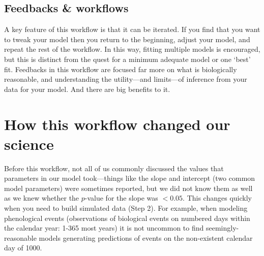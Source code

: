 \documentclass[11pt]{article}
\begin{document}
\subsection*{Feedbacks \& workflows}
A key feature of this workflow is that it can be iterated.  If you find that you want to tweak your model then you return to the beginning, adjust your model, and repeat the rest of the workflow. In this way, fitting multiple models is encouraged, but this is distinct from the quest for a minimum adequate model or one `best' fit. Feedbacks in this workflow are focused far more on what is biologically reasonable, and understanding the utility---and limits---of inference from your data for your model.  And there are big benefits to it. 


\section*{How this workflow changed our science} 
Before this workflow, not all of us commonly discussed the values that parameters in our model took---things like the slope and intercept (two common model parameters) were sometimes reported, but we did not know them as well as we knew whether the $p$-value for the slope was $<0.05$. This changes quickly when you need to build simulated data (Step 2). For example, when modeling phenological events (observations of biological events on numbered days within the calendar year: 1-365 most years) it is not uncommon to find seemingly-reasonable models generating predictions of events on the non-existent calendar day of 1000. %
\end{document}
